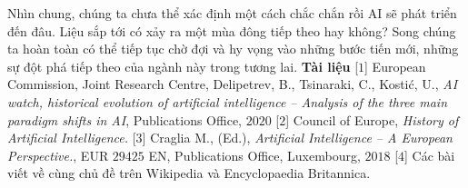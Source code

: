 \begin{multicols}{2}
	\vskip 0.1cm
	Nhìn chung, chúng ta chưa thể xác định một cách chắc chắn rồi AI sẽ phát triển đến đâu. Liệu sắp tới có xảy ra một mùa đông tiếp theo hay không? Song chúng ta hoàn toàn có thể tiếp tục chờ đợi và hy vọng vào những bước tiến mới, những sự đột phá tiếp theo của ngành này trong tương lai.  
	\vskip 0.1cm
	\textbf{\color{cackithi}Tài liệu}
	\vskip 0.1cm
	[$1$] European Commission, Joint Research Centre, Delipetrev, B., Tsinaraki, C., Kostić, U., \textit{AI watch, historical evolution of artificial intelligence -- Analysis of the three main paradigm shifts in AI}, Publications Office, $2020$
	\vskip 0.1cm
	[$2$] Council of Europe, \textit{History of Artificial Intelligence.}
	\vskip 0.1cm	
	[$3$] Craglia M., (Ed.), \textit{Artificial Intelligence -- A European Perspective.}, EUR $29425$ EN, Publications Office, Luxembourg, $2018$
	\vskip 0.1cm
	[$4$] Các bài viết về cùng chủ đề trên Wikipedia và Encyclopaedia Britannica.
\end{multicols}